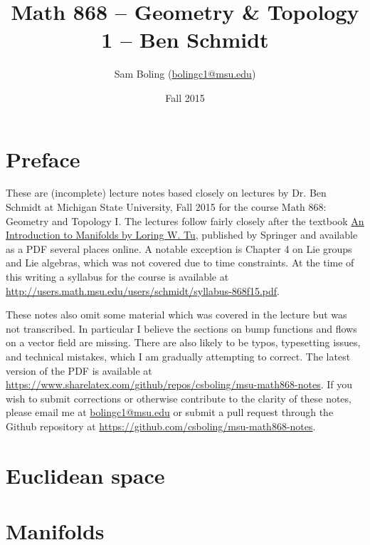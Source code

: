 \documentclass{report}
\title{Math 868 -- Geometry \& Topology 1 -- Ben Schmidt}
\author{Sam Boling (\href{mailto:bolingc1@msu.edu}{bolingc1@msu.edu})}
\date{Fall 2015}
\begin{document}
\maketitle

\chapter*{Preface}
These are (incomplete) lecture notes based closely on lectures by
Dr. Ben Schmidt at Michigan State University, Fall 2015 for the course
Math 868: Geometry and Topology I. The lectures follow fairly closely
after the textbook \href{https://www.springer.com/us/book/9781441973993}{An Introduction
  to Manifolds by Loring W. Tu}, published by Springer and available
as a PDF several places online. A notable exception is Chapter 4 on
Lie groups and Lie algebras, which was not covered due to time
constraints. At the time of this writing a syllabus for the course is
available at
\href{http://users.math.msu.edu/users/schmidt/syllabus-868f15.pdf}{http://users.math.msu.edu/users/schmidt/syllabus-868f15.pdf}.

These notes also omit some material which was covered in the lecture
but was not transcribed. In particular I believe the sections on bump
functions and flows on a vector field are missing. There are also
likely to be typos, typesetting issues, and technical mistakes, which
I am gradually attempting to correct. The latest version of the PDF is available
at \href{https://www.sharelatex.com/github/repos/csboling/msu-math868-notes}{https://www.sharelatex.com/github/repos/csboling/msu-math868-notes}.
If you wish to submit corrections or otherwise contribute to the
clarity of these notes, please email me at
\href{mailto:bolingc1@msu.edu}{bolingc1@msu.edu} or
submit a pull request through the Github repository at
\href{https://github.com/csboling/msu-math868-notes}{https://github.com/csboling/msu-math868-notes}.

\chapter{Euclidean space}



\chapter{Manifolds}






\end{document}
